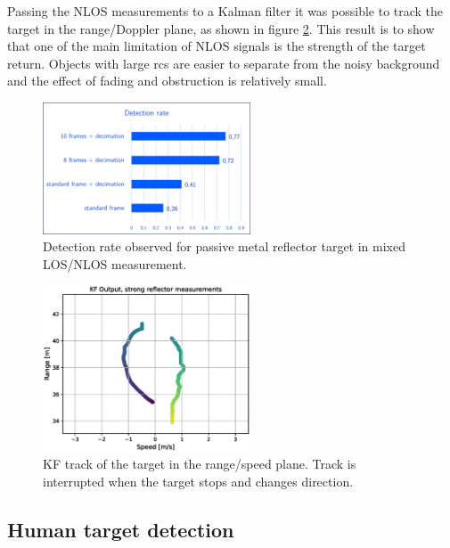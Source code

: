 Passing the NLOS measurements to a Kalman filter it was possible to track the target in the range/Doppler plane, as shown in figure \ref{fig:Test1_kf_track_strong_ref}. This result is to show that one of the main limitation of NLOS signals is the strength of the target return. Objects with large \gls{rcs} are easier to separate from the noisy background and the effect of fading and obstruction is relatively small.

\begin{figure}[H]
	\centering
	\includegraphics[width=0.55\textwidth]{Images/Test1/detect_hist/detect_hist_cabinet_LMsans.png}
	\caption{\small Detection rate observed for passive metal reflector target in mixed LOS/NLOS measurement.}
	\label{fig:Test1_detect_rate_strong_ref}
\end{figure}



\begin{figure}[H]
	\centering
	\includegraphics[width=0.55\textwidth]{Images/Test1/kf_track.eps}
	\caption{\small KF track of the target in the range/speed plane. Track is interrupted when the target stops and changes direction.}
	\label{fig:Test1_kf_track_strong_ref}
\end{figure}


\subsection{Human target detection}

